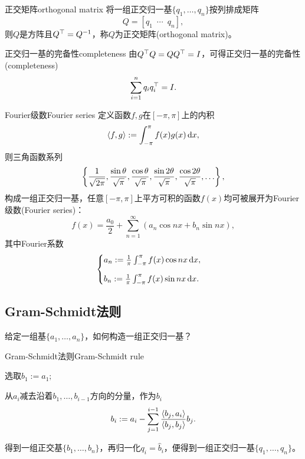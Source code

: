 \begin{definition}
	{正交矩阵}{orthogonal matrix}
	将一组正交归一基$\{q_1,\ldots,q_n\}$按列排成矩阵
	\[
		Q=[q_1\enspace\cdots\enspace q_n],
	\]
	则$Q$是方阵且$Q^\top=Q^{-1}$，称$Q$为正交矩阵(orthogonal matrix)。
\end{definition}
\begin{theorem}
	{正交归一基的完备性}{completeness}
	由$Q^\top Q=QQ^\top=I$，可得正交归一基的完备性(completeness)
	\begin{equation}
		\sum_{i=1}^nq_iq_i^\top=I.
	\end{equation}
\end{theorem}
\begin{example}{Fourier级数}{Fourier series}
	定义函数$f,g$在$[-\pi,\pi]$上的内积
	\[
		\left\langle f,g\right\rangle:=\int_{-\pi}^\pi f(x)g(x)\mathop{}\!\mathrm{d} x,
	\]
	则三角函数系列
	\[
		\left\{\frac1{\sqrt{2\pi}},\frac{\sin\theta}{\sqrt\pi},\frac{\cos\theta}{\sqrt\pi},\frac{\sin2\theta}{\sqrt\pi},\frac{\cos2\theta}{\sqrt\pi},\ldots\right\},
	\]
	构成一组正交归一基，任意$[-\pi,\pi]$上平方可积的函数$f(x)$均可被展开为Fourier级数(Fourier series)：
	\[
		f(x)=\frac{a_0}2+\sum_{n=1}^\infty(a_n\cos nx+b_n\sin nx),
	\]
	其中Fourier系数
	\[
		\begin{cases}
			a_n:=\frac1\pi\int_{-\pi}^\pi f(x)\cos nx\mathop{}\!\mathrm{d} x,\\[2ex]
			b_n:=\frac1\pi\int_{-\pi}^\pi f(x)\sin nx\mathop{}\!\mathrm{d} x.
		\end{cases}
	\]
\end{example}

\subsection{Gram-Schmidt法则}

给定一组基$\{a_1,\ldots,a_n\}$，如何构造一组正交归一基？

\begin{method}{Gram-Schmidt法则}{Gram-Schmidt rule}
	\begin{compactenum}
		\item 选取$b_1:=a_1;$
		\item 从$a_i$减去沿着$b_1,\ldots,b_{i-1}$方向的分量，作为$b_i$
		\[
			b_i:=a_i-\sum_{j=1}^{i-1}\frac{\left\langle b_j,a_i\right\rangle}{\left\langle b_j,b_j\right\rangle}b_j.
		\]
	\end{compactenum}
	得到一组正交基$\{b_1,\ldots,b_n\}$，再归一化$q_i=\hat b_i$，便得到一组正交归一基$\{q_1,\ldots,q_n\}$。
\end{method}

